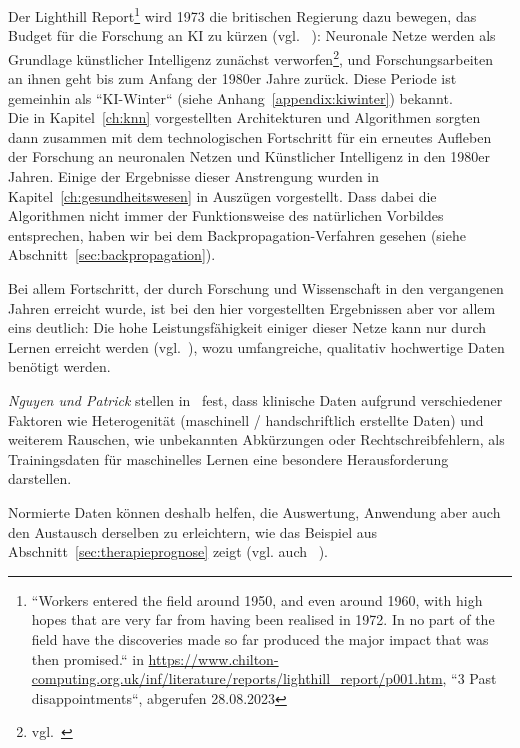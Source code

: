 Der Lighthill Report\footnote{
    ``Workers entered the field around 1950, and even around 1960, with high hopes that are very far from having been realised in 1972. In no part of the field have the discoveries made so far produced the major impact that was then promised.`` in \url{https://www.chilton-computing.org.uk/inf/literature/reports/lighthill\_report/p001.htm}, ``3 Past disappointments``, abgerufen 28.08.2023
} wird 1973 die britischen Regierung dazu bewegen, das Budget für die Forschung an KI zu kürzen (vgl. ~\cite[45]{RN09}): Neuronale Netze werden als Grundlage künstlicher Intelligenz zunächst verworfen\footnote{
    vgl.~\cite[641]{Ola96}
}, und Forschungsarbeiten an ihnen geht bis zum Anfang der 1980er Jahre zurück.
Diese Periode ist gemeinhin als ``KI-Winter`` (siehe Anhang~\ref{appendix:kiwinter}) bekannt.\\

Die in Kapitel~\ref{ch:knn} vorgestellten Architekturen und Algorithmen sorgten dann zusammen mit dem technologischen Fortschritt für ein erneutes Aufleben der Forschung an neuronalen Netzen und Künstlicher Intelligenz in den 1980er Jahren.
Einige der Ergebnisse dieser Anstrengung wurden in Kapitel~\ref{ch:gesundheitswesen} in Auszügen vorgestellt.
Dass dabei die Algorithmen nicht immer der Funktionsweise des natürlichen Vorbildes entsprechen, haben wir bei dem Backpropagation-Verfahren gesehen (siehe Abschnitt~\ref{sec:backpropagation}).

Bei allem Fortschritt, der durch Forschung und Wissenschaft in den vergangenen Jahren erreicht wurde, ist bei den hier vorgestellten Ergebnissen aber vor allem eins deutlich: Die hohe Leistungsfähigkeit einiger dieser Netze kann nur durch Lernen erreicht werden (vgl.~\cite[40]{AHR19}), wozu umfangreiche, qualitativ hochwertige Daten benötigt werden.

\textit{Nguyen und Patrick} stellen in~\cite{NP16} fest, dass klinische Daten aufgrund verschiedener Faktoren wie Heterogenität (maschinell / handschriftlich erstellte Daten) und weiterem Rauschen, wie unbekannten Abkürzungen oder Rechtschreibfehlern, als Trainingsdaten für maschinelles Lernen eine besondere Herausforderung darstellen.

Normierte Daten können deshalb helfen, die Auswertung, Anwendung aber auch den Austausch derselben zu erleichtern, wie das Beispiel aus Abschnitt~\ref{sec:therapieprognose} zeigt (vgl. auch ~\cite[42]{AHR19}).

